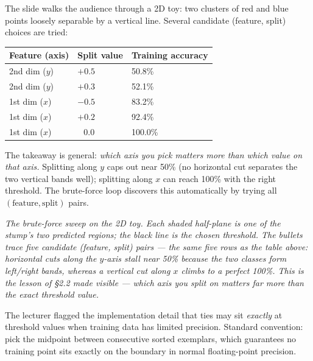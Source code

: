 \documentclass[11pt, a4paper]{article}
\newcommand{\thead}[1]{\textbf{#1}}
\begin{document}
The slide walks the audience through a 2D toy: two clusters of red and blue points loosely separable by a vertical line. Several candidate (feature, split) choices are tried:

\begin{center}
\begin{tabular}{lll}
\toprule
\thead{Feature (axis)} & \thead{Split value} & \thead{Training accuracy} \\
\midrule
2nd dim ($y$) & $+0.5$ & 50.8\% \\
2nd dim ($y$) & $+0.3$ & 52.1\% \\
1st dim ($x$) & $-0.5$ & 83.2\% \\
1st dim ($x$) & $+0.2$ & 92.4\% \\
1st dim ($x$) & $\;\;\,0.0$ & 100.0\% \\
\bottomrule
\end{tabular}
\end{center}

The takeaway is general: \emph{which axis you pick matters more than which value on that axis.} Splitting along $y$ caps out near 50\% (no horizontal cut separates the two vertical bands well); splitting along $x$ can reach 100\% with the right threshold. The brute-force loop discovers this automatically by trying all $(\text{feature}, \text{split})$ pairs.

\begin{center}

\footnotesize\textit{The brute-force sweep on the 2D toy. Each shaded half-plane is one of the stump's two predicted regions; the black line is the chosen threshold. The bullets trace five candidate (feature, split) pairs --- the same five rows as the table above: horizontal cuts along the $y$-axis stall near 50\% because the two classes form left/right bands, whereas a vertical cut along $x$ climbs to a perfect 100\%. This is the lesson of \S2.2 made visible --- \emph{which axis} you split on matters far more than the exact threshold value.}
\end{center}

\begin{notebox}
The lecturer flagged the implementation detail that ties may sit \emph{exactly} at threshold values when training data has limited precision. Standard convention: pick the midpoint between consecutive sorted exemplars, which guarantees no training point sits exactly on the boundary in normal floating-point precision.
\end{notebox}
\end{document}
